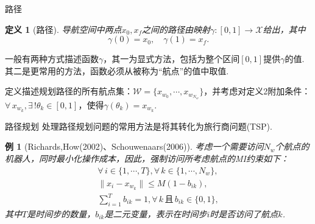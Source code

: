 \documentclass[notheorems,11pt]{beamer}
\theoremstyle{plain}
\numberwithin{theorem}{section}
\newtheorem{definition}{定义}
\numberwithin{lemma}{section}
\numberwithin{corollary}{section}
\theoremstyle{example}
\newtheorem{example}{例}
\begin{document}
\begin{frame}{路径}
  \begin{definition}[路径]
    导航空间中两点$x_0,x_f$之间的路径由映射$\gamma:[0,1]\to \mathcal{X}$给出，其中
    \begin{equation}
      \gamma(0)=x_0,\quad \gamma(1)=x_f.
    \end{equation}
  \end{definition}
  一般有两种方式描述函数$\gamma$，其一为显式方法，包括为整个区间$[0,1]$提供$\gamma$的值.其二是更常用的方法，函数必须从被称为“航点”的值中取值.\par
  定义描述规划路径的所有航点集：$\mathcal{W}=\{x_{w_0},\cdots,x_{w_{N_w}}\}$，并考虑对定义2附加条件：$\forall\, x_{w_k},\exists\, !\theta_k\in[0,1]$，使得$\gamma(\theta_k)=x_{w_k}$.
\end{frame}

\begin{frame}{路径规划}
  处理路径规划问题的常用方法是将其转化为旅行商问题(TSP).
  \begin{example}[Richards,How(2002)、Schouwenaars(2006)]
    考虑一个需要访问$N_w$个航点的机器人，同时最小化操作成本，因此，强制访问所考虑航点的MI约束如下：
    \begin{subequations}
      \begin{gather}
        \forall\, i\in\{1,\cdots,T\},\forall\, k\in\{1,\cdots,N_w\}, \\
        \|x_i-x_{w_k}\|\leqslant M(1-b_{ik}), \\
        \sum_{i=1}^T{b_{ik}}=1,\forall\, k\,\text{且}\, b_{ik}\in\{0,1\}, \label{22c}
      \end{gather}
    \end{subequations}
    其中$T$是时间步的数量，$b_{ik}$是二元变量，表示在时间步$i$时是否访问了航点$k$.
  \end{example}
\end{frame}
\end{document}
